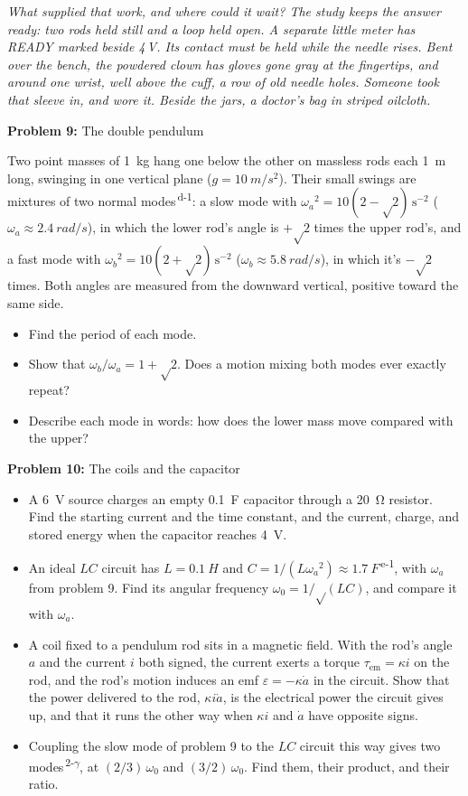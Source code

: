 \documentclass[11pt]{article}
\newcommand{\room}[1]{\par\bigskip{\large\bfseries #1}\par\nopagebreak\smallskip}
\newcommand{\scene}[1]{\par{\itshape #1}\par}
\newcommand{\problem}[2]{\par\medskip\textbf{Problem #1:} #2\par\nopagebreak}
\newenvironment{parts}{\begin{itemize}[leftmargin=3.4em,labelwidth=2.8em,labelsep=0.6em,align=left,itemsep=2pt,topsep=3pt]}{\end{itemize}}
\newcommand{\pt}[1]{\item[\textbf{#1}]}
\newcommand{\sv}[1]{\textsuperscript{\dag\,#1}}
\newcommand{\rt}{\text{√}}  %
\begin{document}
\room{Study}
\scene{What supplied that work, and where could it wait? The study keeps the answer ready: two rods held still and a loop held open. A separate little meter has READY marked beside 4\,V. Its contact must be held while the needle rises. Bent over the bench, the powdered clown has gloves gone gray at the fingertips, and around one wrist, well above the cuff, a row of old needle holes. Someone took that sleeve in, and wore it. Beside the jars, a doctor's bag in striped oilcloth.}
\problem{9}{The double pendulum}
Two point masses of \SI{1}{kg} hang one below the other on massless rods each \SI{1}{m} long, swinging in one vertical plane ($g = \SI{10}{m/s^2}$). Their small swings are mixtures of two normal modes\sv{d-1}: a slow mode with $\omega_a{}^2 = 10(2 - \rt2)\,\mathrm{s^{-2}}$ ($\omega_a \approx \SI{2.4}{rad/s}$), in which the lower rod's angle is $+\rt2$ times the upper rod's, and a fast mode with $\omega_b{}^2 = 10(2 + \rt2)\,\mathrm{s^{-2}}$ ($\omega_b \approx \SI{5.8}{rad/s}$), in which it's $-\rt2$ times. Both angles are measured from the downward vertical, positive toward the same side.
\begin{parts}
\pt{9-a} Find the period of each mode.
\pt{9-b} Show that $\omega_b/\omega_a = 1 + \rt2$. Does a motion mixing both modes ever exactly repeat?
\pt{9-c} Describe each mode in words: how does the lower mass move compared with the upper?
\end{parts}

\problem{10}{The coils and the capacitor}
\begin{parts}
\pt{10-a} A \SI{6}{V} source charges an empty \SI{0.1}{F} capacitor through a \SI{20}{\ohm} resistor. Find the starting current and the time constant, and the current, charge, and stored energy when the capacitor reaches \SI{4}{V}.
\pt{10-b} An ideal $LC$ circuit has $L = \SI{0.1}{H}$ and $C = 1/(L\omega_a{}^2) \approx \SI{1.7}{F}$\sv{e-1}, with $\omega_a$ from problem 9. Find its angular frequency $\omega_0 = 1/\rt(LC)$, and compare it with $\omega_a$.
\pt{10-c} A coil fixed to a pendulum rod sits in a magnetic field. With the rod's angle $a$ and the current $i$ both signed, the current exerts a torque $\tau_{\mathrm{em}} = \kappa i$ on the rod, and the rod's motion induces an emf $\varepsilon = -\kappa\dot a$ in the circuit. Show that the power delivered to the rod, $\kappa i\dot a$, is the electrical power the circuit gives up, and that it runs the other way when $\kappa i$ and $\dot a$ have opposite signs.
\pt{10-d} Coupling the slow mode of problem 9 to the $LC$ circuit this way gives two modes\sv{2-$\gamma$}, at $(2/3)\,\omega_0$ and $(3/2)\,\omega_0$. Find them, their product, and their ratio.
\end{parts}
\end{document}
